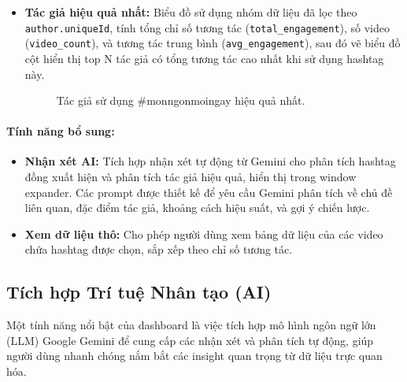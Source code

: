 \begin{itemize}
        \item \textbf{Tác giả hiệu quả nhất:} Biểu đồ sử dụng nhóm dữ liệu đã lọc theo \texttt{author.uniqueId}, tính tổng chỉ số tương tác (\texttt{total\_engagement}), số video (\texttt{video\_count}), và tương tác trung bình (\texttt{avg\_engagement}), sau đó vẽ biểu đồ cột hiển thị top N tác giả có tổng tương tác cao nhất khi sử dụng hashtag này.
        \begin{figure}[H]
            \centering
            \caption{Tác giả sử dụng \#monngonmoingay hiệu quả nhất.}
        \end{figure}
    \end{itemize}

\paragraph{Tính năng bổ sung:}
    \begin{itemize}
        \item \textbf{Nhận xét AI:} Tích hợp nhận xét tự động từ Gemini cho phân tích hashtag đồng xuất hiện và phân tích tác giả hiệu quả, hiển thị trong window expander. Các prompt được thiết kế để yêu cầu Gemini phân tích về chủ đề liên quan, đặc điểm tác giả, khoảng cách hiệu suất, và gợi ý chiến lược.
        
        \item \textbf{Xem dữ liệu thô:} Cho phép người dùng xem bảng dữ liệu của các video chứa hashtag được chọn, sắp xếp theo chỉ số tương tác.
    \end{itemize}


\subsection{Tích hợp Trí tuệ Nhân tạo (AI)}

Một tính năng nổi bật của dashboard là việc tích hợp mô hình ngôn ngữ lớn (LLM) Google Gemini để cung cấp các nhận xét và phân tích tự động, giúp người dùng nhanh chóng nắm bắt các insight quan trọng từ dữ liệu trực quan hóa.


